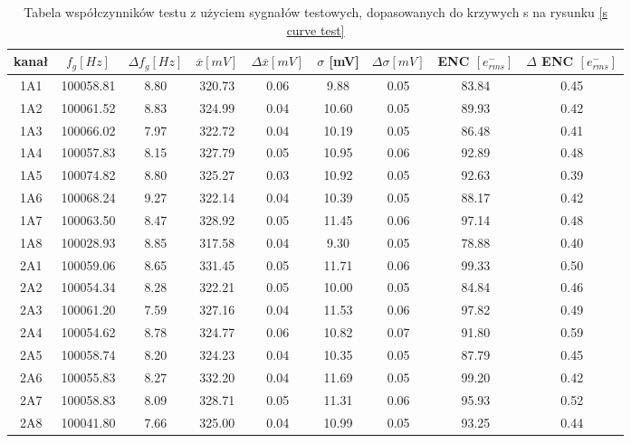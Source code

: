 \begin{table}
        \caption{Tabela współczynników testu z użyciem sygnałów testowych, dopasowanych do krzywych s na rysunku \ref{s curve test}}
        \label{tabela wsp test}
        \begin{adjustbox}{width=1.1\linewidth,center}
        \begin{tabular}{|c|c|c|c|c|c|c|c|c|}
                \hline
                kanał & $f_g [Hz]$&$\Delta f_g [Hz]$&$\overline{x} [mV]$&$\Delta \overline{x} [mV]$&  $\sigma$ [mV]&  $\Delta \sigma [mV]$ & ENC $[e^-_{rms}]$& $\Delta$ ENC $[e^-_{rms}]$\\ \hline

                        1A1&100058.81&8.80&320.73&0.06&9.88&0.05&83.84&0.45 \\ \hline 
                        1A2&100061.52&8.83&324.99&0.04&10.60&0.05&89.93&0.42 \\ \hline 
                        1A3&100066.02&7.97&322.72&0.04&10.19&0.05&86.48&0.41 \\ \hline 
                        1A4&100057.83&8.15&327.79&0.05&10.95&0.06&92.89&0.48 \\ \hline 
                        1A5&100074.82&8.80&325.27&0.03&10.92&0.05&92.63&0.39 \\ \hline 
                        1A6&100068.24&9.27&322.14&0.04&10.39&0.05&88.17&0.42 \\ \hline 
                        1A7&100063.50&8.47&328.92&0.05&11.45&0.06&97.14&0.48 \\ \hline 
                        1A8&100028.93&8.85&317.58&0.04&9.30&0.05&78.88&0.40 \\ \hline 
                        2A1&100059.06&8.65&331.45&0.05&11.71&0.06&99.33&0.50 \\ \hline 
                        2A2&100054.34&8.28&322.21&0.05&10.00&0.05&84.84&0.46 \\ \hline 
                        2A3&100061.20&7.59&327.16&0.04&11.53&0.06&97.82&0.49 \\ \hline 
                        2A4&100054.62&8.78&324.77&0.06&10.82&0.07&91.80&0.59 \\ \hline 
                        2A5&100058.74&8.20&324.23&0.04&10.35&0.05&87.79&0.45 \\ \hline 
                        2A6&100055.83&8.27&332.20&0.04&11.69&0.05&99.20&0.42 \\ \hline 
                        2A7&100058.83&8.09&328.71&0.05&11.31&0.06&95.93&0.52 \\ \hline 
                        2A8&100041.80&7.66&325.00&0.04&10.99&0.05&93.25&0.44 \\ \hline                    
        \end{tabular}
        \end{adjustbox} 
\end{table}


